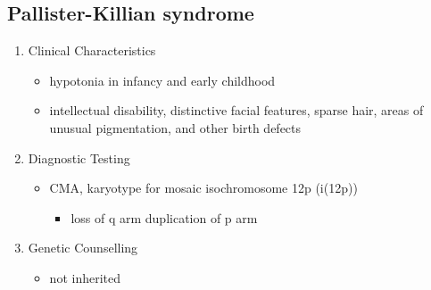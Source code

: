 \documentclass[12pt]{scrartcl}
\begin{document}
\subsection{Pallister-Killian syndrome}
\label{sec:org35bbf33}
\begin{enumerate}
\item Clinical Characteristics
\label{sec:orgfefba89}
\begin{itemize}
\item hypotonia in infancy and early childhood
\item intellectual disability, distinctive facial features, sparse hair,
areas of unusual pigmentation, and other birth defects
\end{itemize}

\item Diagnostic Testing
\label{sec:org117a976}
\begin{itemize}
\item CMA, karyotype for mosaic isochromosome 12p (i(12p))
\begin{itemize}
\item loss of q arm duplication of p arm
\end{itemize}
\end{itemize}

\item Genetic Counselling
\label{sec:orgff85a54}
\begin{itemize}
\item not inherited
\end{itemize}
\end{enumerate}
\end{document}
